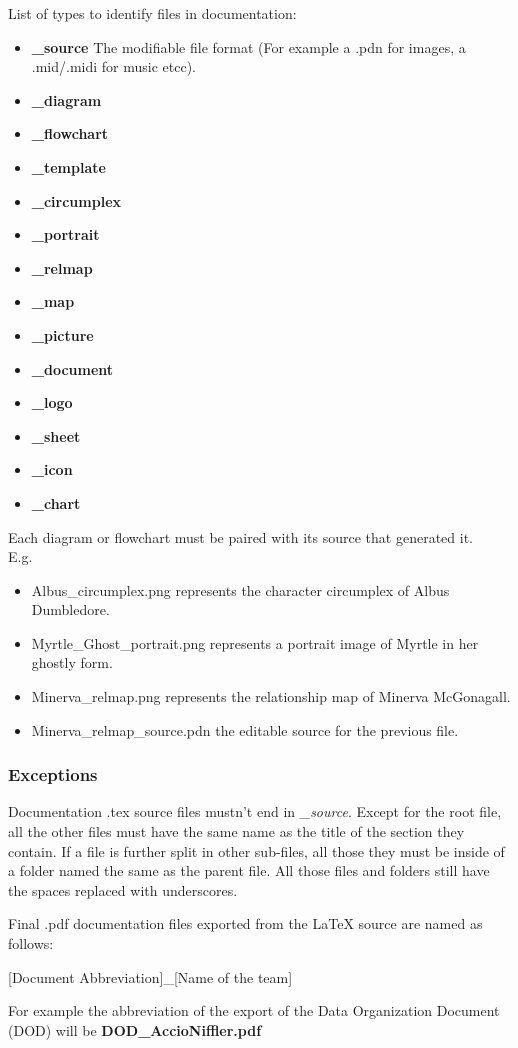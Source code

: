 List of types to identify files in documentation:
\begin{itemize}
	\item \textbf{\_source} The modifiable file format (For example a .pdn for images, a .mid/.midi for music etcc).
	\item \textbf{\_diagram}
	\item \textbf{\_flowchart}
	\item \textbf{\_template}
	\item \textbf{\_circumplex}
	\item \textbf{\_portrait}
	\item \textbf{\_relmap}
	\item \textbf{\_map}
	\item \textbf{\_picture}
	\item \textbf{\_document}
	\item \textbf{\_logo}
	\item \textbf{\_sheet}
	\item \textbf{\_icon}
	\item \textbf{\_chart}
\end{itemize}

Each diagram or flowchart must be paired with its source that generated it. \\

E.g.

\begin{itemize}
	\item Albus\_circumplex.png represents the character circumplex of Albus Dumbledore.
	\item Myrtle\_Ghost\_portrait.png represents a portrait image of Myrtle in her ghostly form.
	\item Minerva\_relmap.png represents the relationship map of Minerva McGonagall.
	\item Minerva\_relmap\_source.pdn the editable source for the previous file.
\end{itemize}

\subsubsection*{Exceptions}

Documentation .tex source files mustn't end in \textit{\_source}. Except for the root file, all the other files must have the same name as the title of the section they contain. If a file is further split in other sub-files, all those they must be inside of a folder named the same as the parent file. All those files and folders still have the spaces replaced with underscores.

Final .pdf documentation files exported from the LaTeX source are named as follows:

[Document Abbreviation]\_[Name of the team]

For example the abbreviation of the export of the Data Organization Document (DOD) will be \textbf{DOD\_AccioNiffler.pdf}

\pagebreak